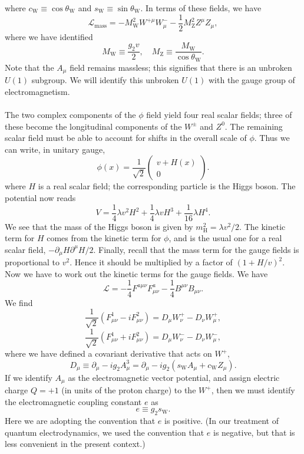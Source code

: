 where $c_{\mathrm{W}} \equiv \cos \theta_{\mathrm{W}}$ and $s_{\mathrm{W}} \equiv \sin \theta_{\mathrm{W}}$. 
In terms of these fields, we have
\[\mathcal{L}_{\mathrm{mass}} = -M_{\mathrm{W}}^2 W^{+\mu} W^{-}_{\mu} - \frac{1}{2}M_{\mathrm{Z}}^2 Z^{\mu}Z_{\mu},\]
where we have identified
\[M_{\mathrm{W}} \equiv \frac{g_2v}{2} , \quad M_{\mathrm{Z}} \equiv \frac{M_{\mathrm{W}}}{\cos\theta_{\mathrm{W}}}.\]
Note that the $A_{\mu}$ field remains massless; this signifies that there is an unbroken $U(1)$ subgroup. We will identify this unbroken $U(1)$ with the gauge
group of electromagnetism.
\\ \\
The two complex components of the $\phi$ field yield four real scalar fields; three of these become the longitudinal components of the $W^{\pm}$ and $Z^0$. The remaining scalar field must be able to account for shifts in the overall scale of $\phi$. Thus we can write, in unitary gauge,
\[\phi(x) = \frac{1}{\sqrt{2}} \begin{pmatrix}
v + H(x) \\ 0
\end{pmatrix}.\]
where $H$ is a real scalar field; the corresponding particle is the Higgs boson. The potential now reads
\[V = \frac{1}{4}\lambda v^2H^2 + \frac{1}{4}\lambda v H^3 + \frac{1}{16}\lambda H^4.\]
We see that the mass of the Higgs boson is given by $m_{\mathrm{H}}^2 = {\lambda v^2}/{2}$. The kinetic term for $H$ comes from the kinetic term for $\phi$, and is the usual one for a real scalar field, $-{\partial_{\mu}H \partial^{\mu}H}/{2}$. Finally, recall that the mass term for the gauge fields is proportional to $v^2$. Hence it should be multiplied by a factor of $(1 + {H}/{v})^2$.
Now we have to work out the kinetic terms for the gauge fields. We have
\[\mathcal{L} = -\frac{1}{4}F^{a\mu\nu}F^a_{\mu\nu} - \frac{1}{4}B^{\mu\nu}B_{\mu\nu}.\]
We find
\[\frac{1}{\sqrt{2}} (F^1_{\mu\nu} - iF^2_{\mu\nu}) = D_{\mu} W^+_{\nu} - D_{\nu}W^+_{\mu},\]
\[\frac{1}{\sqrt{2}} (F^1_{\mu\nu} + iF^2_{\mu\nu}) = D_{\mu} W^-_{\nu} - D_{\nu}W^-_{\mu},\]
where we have defined a covariant derivative that acts on
$W^+$,
\[D_{\mu} \equiv \partial_{\mu} - ig_2A^3_{\mu} = \partial_{\mu} - ig_2(s_{\mathrm{W}}A_{\mu} + c_{\mathrm{W}} Z_{\mu}).\]
If we identify $A_{\mu}$ as the electromagnetic vector potential, and assign electric charge $Q = +1$ (in units of the proton charge) to the $W^+$, then we must identify the electromagnetic coupling constant $e$ as
\[e \equiv g_2 s_{\mathrm{W}}.\]
Here we are adopting the convention that $e$ is positive. (In our treatment of quantum electrodynamics, we used the convention that $e$ is negative, but that is less convenient in the present context.)

